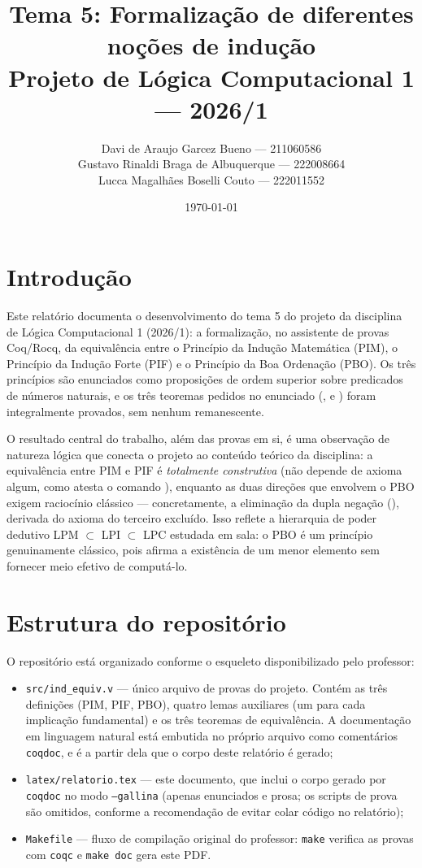 \documentclass{article}
\title{Tema 5: Formalização de diferentes noções de indução \\
{\large Projeto de Lógica Computacional 1 --- 2026/1}}
\author{Davi de Araujo Garcez Bueno --- 211060586\\
        Gustavo Rinaldi Braga de Albuquerque --- 222008664\\
        Lucca Magalhães Boselli Couto --- 222011552}
\date{\today}
\begin{document}
\maketitle

\section*{Introdução}

Este relatório documenta o desenvolvimento do tema 5 do projeto da
disciplina de Lógica Computacional 1 (2026/1): a formalização, no
assistente de provas Coq/Rocq, da equivalência entre o Princípio da
Indução Matemática (PIM), o Princípio da Indução Forte (PIF) e o
Princípio da Boa Ordenação (PBO). Os três princípios são enunciados
como proposições de ordem superior sobre predicados de números
naturais, e os três teoremas pedidos no enunciado
(,  e
) foram integralmente provados, sem
nenhum  remanescente.

O resultado central do trabalho, além das provas em si, é uma
observação de natureza lógica que conecta o projeto ao conteúdo
teórico da disciplina: a equivalência entre PIM e PIF é
\emph{totalmente construtiva} (não depende de axioma algum, como
atesta o comando ), enquanto as duas
direções que envolvem o PBO exigem raciocínio clássico ---
concretamente, a eliminação da dupla negação (),
derivada do axioma do terceiro excluído. Isso reflete a hierarquia
de poder dedutivo LPM $\subset$ LPI $\subset$ LPC estudada em sala:
o PBO é um princípio genuinamente clássico, pois afirma a
existência de um menor elemento sem fornecer meio efetivo de
computá-lo.

\section*{Estrutura do repositório}

O repositório está organizado conforme o esqueleto disponibilizado
pelo professor:

\begin{itemize}
  \item \texttt{src/ind\_equiv.v} --- único arquivo de provas do
    projeto. Contém as três definições (PIM, PIF, PBO), quatro
    lemas auxiliares (um para cada implicação fundamental) e os três
    teoremas de equivalência. A documentação em linguagem natural
    está embutida no próprio arquivo como comentários
    \texttt{coqdoc}, e é a partir dela que o corpo deste relatório é
    gerado;
  \item \texttt{latex/relatorio.tex} --- este documento, que inclui
    o corpo gerado por \texttt{coqdoc} no modo \texttt{--gallina}
    (apenas enunciados e prosa; os scripts de prova são omitidos,
    conforme a recomendação de evitar colar código no relatório);
  \item \texttt{Makefile} --- fluxo de compilação original do
    professor: \texttt{make} verifica as provas com \texttt{coqc} e
    \texttt{make doc} gera este PDF.
\end{itemize}
\end{document}
